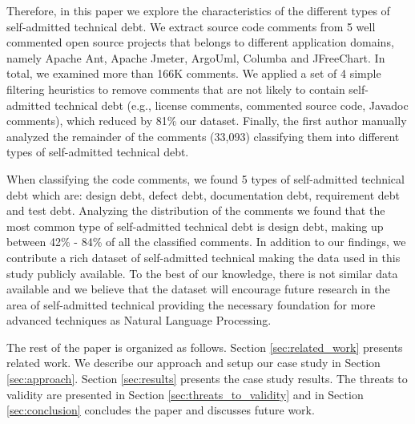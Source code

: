 
Therefore, in this paper we explore the characteristics of the different types of self-admitted technical debt. We extract source code comments from 5 well commented open source projects that belongs to different application domains, namely Apache Ant, Apache Jmeter, ArgoUml, Columba and JFreeChart. In total, we examined more than 166K comments. We applied a set of 4 simple filtering heuristics to remove comments that are not likely to contain self-admitted technical debt (e.g., license comments, commented source code, Javadoc comments), which reduced by 81\% our dataset. Finally, the first author manually analyzed the remainder of the comments (33,093) classifying them into different types of self-admitted technical debt. 

When classifying the code comments, we found 5 types of self-admitted technical debt which are: design debt, defect debt, documentation debt, requirement debt and test debt. Analyzing the distribution of the comments we found that the most common type of self-admitted technical debt is design debt, making up between 42\% - 84\% of all the classified comments. In addition to our findings, we contribute a rich dataset of self-admitted technical making the data used in this study publicly available. To the best of our knowledge, there is not similar data available and we believe that the dataset will encourage future research in the area of self-admitted technical providing the necessary foundation for more advanced techniques as Natural Language Processing.  


The rest of the paper is organized as follows. Section \ref{sec:related_work} presents related work. We describe our approach and setup our case study in Section \ref{sec:approach}. Section \ref{sec:results} presents the case study results. The threats to validity are presented in Section \ref{sec:threats_to_validity} and in Section \ref{sec:conclusion} concludes the paper and discusses future work. 